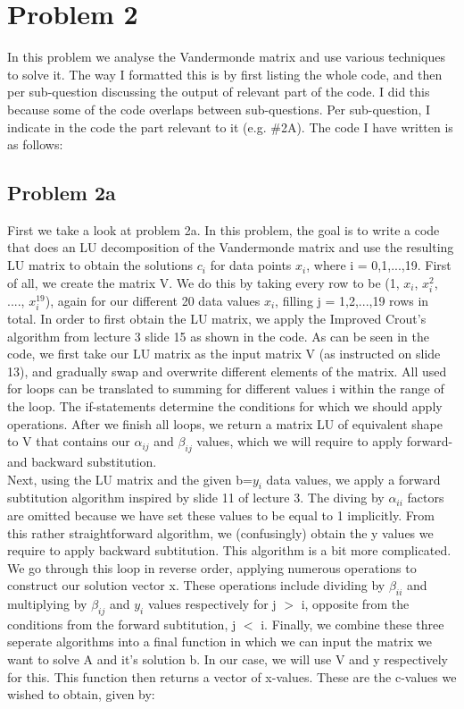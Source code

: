 \section{Problem 2}

In this problem we analyse the Vandermonde matrix and use various techniques to solve it. The way I formatted this is by first listing the whole code, and then per sub-question discussing the output of relevant part of the code. I did this because some of the code overlaps between sub-questions. Per sub-question, I indicate in the code the part relevant to it (e.g. \#2A). The code I have written is as follows: 



\subsection{Problem 2a}

First we take a look at problem 2a. In this problem, the goal is to write a code that does an LU decomposition of the Vandermonde matrix and use the resulting LU matrix to obtain the solutions $c_i$ for data points $x_i$, where i = 0,1,...,19. First of all, we create the matrix V. We do this by taking every row to be (1, $x_i$, $x_{i}^2$, ...., $x_{i}^{19}$), again for our different 20 data values $x_i$, filling j = 1,2,...,19 rows in total. In order to first obtain the LU matrix, we apply the Improved Crout's algorithm from lecture 3 slide 15 as shown in the code. As can be seen in the code, we first take our LU matrix as the input matrix V (as instructed on slide 13), and gradually swap and overwrite different elements of the matrix. All used for loops can be translated to summing for different values i within the range of the loop. The if-statements determine the conditions for which we should apply operations. After we finish all loops, we return a matrix LU of equivalent shape to V that contains our $\alpha_{ij}$ and $\beta_{ij}$ values, which we will require to apply forward- and backward substitution.\\

Next, using the LU matrix and the given b=$y_i$ data values, we apply a forward subtitution algorithm inspired by slide 11 of lecture 3. The diving by $\alpha_{ii}$ factors are omitted because we have set these values to be equal to 1 implicitly. From this rather straightforward algorithm, we (confusingly) obtain the y values we require to apply backward subtitution. This algorithm is a bit more complicated. We go through this loop in reverse order, applying numerous operations to construct our solution vector x. These operations include dividing by $\beta_{ii}$ and multiplying by $\beta_{ij}$ and $y_i$ values respectively for j $>$ i, opposite from the conditions from the forward subtitution, j $<$ i. Finally, we combine these three seperate algorithms into a final function in which we can input the matrix we want to solve A and it's solution b. In our case, we will use V and y respectively for this. This function then returns a vector of x-values. These are the c-values we wished to obtain, given by:

